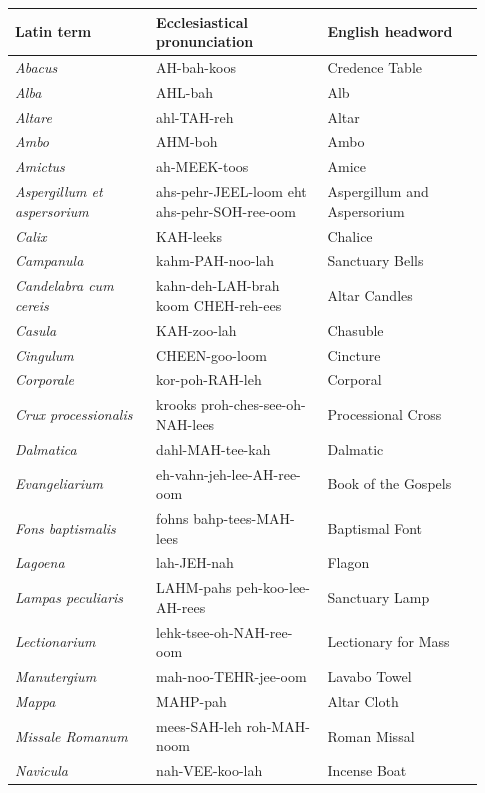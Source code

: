{\footnotesize\begin{longtable}{>{\raggedright\arraybackslash}p{0.28\linewidth}>{\raggedright\arraybackslash}p{0.34\linewidth}>{\raggedright\arraybackslash}p{0.31\linewidth}}
\toprule
\textbf{Latin term} & \textbf{Ecclesiastical pronunciation} & \textbf{English headword} \\
\midrule
\endhead
\textit{Abacus} & AH-bah-koos & Credence Table \\
\textit{Alba} & AHL-bah & Alb \\
\textit{Altare} & ahl-TAH-reh & Altar \\
\textit{Ambo} & AHM-boh & Ambo \\
\textit{Amictus} & ah-MEEK-toos & Amice \\
\textit{Aspergillum et aspersorium} & ahs-pehr-JEEL-loom eht ahs-pehr-SOH-ree-oom & Aspergillum and Aspersorium \\
\textit{Calix} & KAH-leeks & Chalice \\
\textit{Campanula} & kahm-PAH-noo-lah & Sanctuary Bells \\
\textit{Candelabra cum cereis} & kahn-deh-LAH-brah koom CHEH-reh-ees & Altar Candles \\
\textit{Casula} & KAH-zoo-lah & Chasuble \\
\textit{Cingulum} & CHEEN-goo-loom & Cincture \\
\textit{Corporale} & kor-poh-RAH-leh & Corporal \\
\textit{Crux processionalis} & krooks proh-ches-see-oh-NAH-lees & Processional Cross \\
\textit{Dalmatica} & dahl-MAH-tee-kah & Dalmatic \\
\textit{Evangeliarium} & eh-vahn-jeh-lee-AH-ree-oom & Book of the Gospels \\
\textit{Fons baptismalis} & fohns bahp-tees-MAH-lees & Baptismal Font \\
\textit{Lagoena} & lah-JEH-nah & Flagon \\
\textit{Lampas peculiaris} & LAHM-pahs peh-koo-lee-AH-rees & Sanctuary Lamp \\
\textit{Lectionarium} & lehk-tsee-oh-NAH-ree-oom & Lectionary for Mass \\
\textit{Manutergium} & mah-noo-TEHR-jee-oom & Lavabo Towel \\
\textit{Mappa} & MAHP-pah & Altar Cloth \\
\textit{Missale Romanum} & mees-SAH-leh roh-MAH-noom & Roman Missal \\
\textit{Navicula} & nah-VEE-koo-lah & Incense Boat \\

\end{longtable}}
